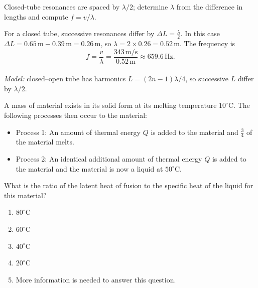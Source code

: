 \begin{answerbox}
\end{answerbox}
\begin{insightbox}
Closed-tube resonances are spaced by $\lambda/2$; determine $\lambda$ from the difference in lengths and compute $f=v/\lambda$.
\end{insightbox}
\begin{solutionbox}

For a closed tube, successive resonances differ by $\Delta L = \tfrac{\lambda}{2}$. In this case $\Delta L = 0.65\,\text{m} - 0.39\,\text{m} = 0.26\,\text{m}$, so $\lambda = 2\times 0.26 = 0.52\,\text{m}$. The frequency is
\[
 f = \frac{v}{\lambda} = \frac{343\,\text{m/s}}{0.52\,\text{m}} \approx 659.6\,\text{Hz}.
\]
\\
\emph{Model:} closed–open tube has harmonics $L=(2n-1)\lambda/4$, so successive $L$ differ by $\lambda/2$.
\end{solutionbox}

\item \label{prob:4}
A mass of material exists in its solid form at its melting temperature $10^\circ$C. The following processes then occur to the material:
\begin{itemize}
    \item Process 1: An amount of thermal energy $Q$ is added to the material and $\tfrac{3}{4}$ of the material melts.
    \item Process 2: An identical additional amount of thermal energy $Q$ is added to the material and the material is now a liquid at $50^\circ$C.
\end{itemize}
What is the ratio of the latent heat of fusion to the specific heat of the liquid for this material?
\begin{enumerate}[label=(\Alph*)]
    \item $80^\circ$C
    \item $60^\circ$C
    \item $40^\circ$C
    \item $20^\circ$C
    \item More information is needed to answer this question.
\end{enumerate}

